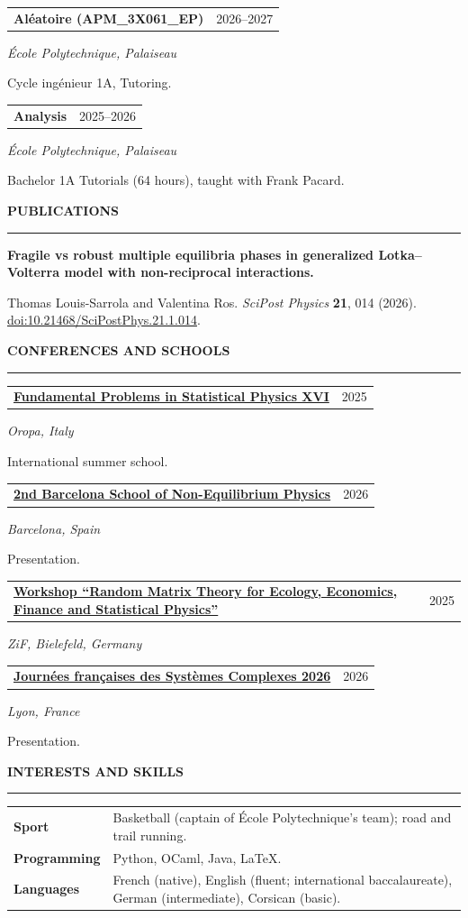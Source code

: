 \documentclass[9pt,a4paper]{extarticle}
\makeatletter
\newcommand{\cvsection}[1]{%
  \vspace{0.48em}%
  {\large\bfseries\color{accent}\MakeUppercase{#1}}\\[-0.45em]
  {\color{accent}\rule{\linewidth}{0.55pt}}\par\vspace{0.22em}
}
\newcommand{\entry}[4]{%
  \begin{tabularx}{\linewidth}{@{}Xr@{}}
    \textbf{#1} & #2 \\
  \end{tabularx}\par
  {\itshape #3}\par
  #4\par\vspace{0.32em}
}
\makeatother
\begin{document}
\entry{Aléatoire (APM\_3X061\_EP)}{2026--2027}
  {École Polytechnique, Palaiseau}
  {Cycle ingénieur 1A, Tutoring.}

\entry{Analysis}{2025--2026}
  {École Polytechnique, Palaiseau}
  {Bachelor 1A Tutorials (64 hours), taught with Frank Pacard.}

\cvsection{Publications}
\textbf{Fragile vs robust multiple equilibria phases in generalized Lotka--Volterra model with non-reciprocal interactions.}\par
Thomas Louis-Sarrola and Valentina Ros. \textit{SciPost Physics} \textbf{21}, 014 (2026).
\href{https://doi.org/10.21468/SciPostPhys.21.1.014}{doi:10.21468/SciPostPhys.21.1.014}.\par

\cvsection{Conferences and schools}
\entry{\href{https://fpspxvi.sciencesconf.org/}{Fundamental Problems in Statistical Physics XVI}}{2025}
  {Oropa, Italy}
  {International summer school.}

\entry{\href{https://sites.google.com/view/noneqstatphys/home}{2nd Barcelona School of Non-Equilibrium Physics}}{2026}
  {Barcelona, Spain}
  {Presentation.}

\entry{\href{https://www.uni-bielefeld.de/einrichtungen/zif/groups/previous/matrices/}{Workshop ``Random Matrix Theory for Ecology, Economics, Finance and Statistical Physics''}}{2025}
  {ZiF, Bielefeld, Germany}
  {}

\entry{\href{https://css-fr2026.sciencesconf.org/}{Journées françaises des Systèmes Complexes 2026}}{2026}
  {Lyon, France}
  {Presentation.}

\cvsection{Interests and skills}
\begin{tabularx}{\linewidth}{@{}>{\bfseries}p{2.5cm}X@{}}
  Sport & Basketball (captain of École Polytechnique's team); road and trail running. \\
  Programming & Python, OCaml, Java, LaTeX. \\
  Languages & French (native), English (fluent; international baccalaureate), German (intermediate), Corsican (basic).
\end{tabularx}
\end{document}
